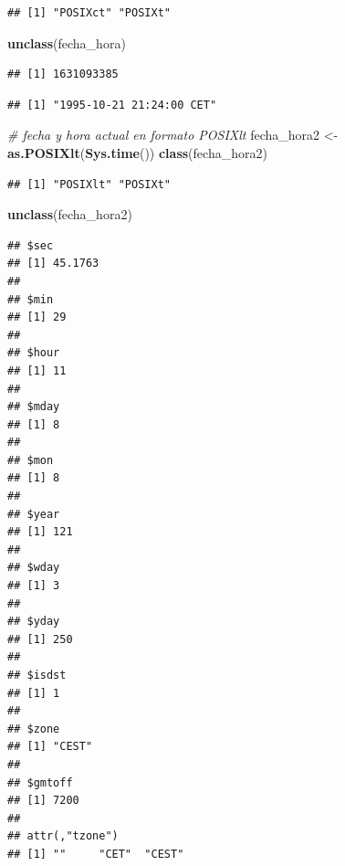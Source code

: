 \documentclass[11pt,]{book}
\newenvironment{Shaded}{\begin{snugshade}}{\end{snugshade}}
\newcommand{\CommentTok}[1]{\textcolor[rgb]{0.37,0.37,0.37}{\textit{#1}}}
\newcommand{\KeywordTok}[1]{\textcolor[rgb]{0.27,0.27,0.27}{\textbf{#1}}}
\newcommand{\NormalTok}[1]{#1}
\newcommand{\StringTok}[1]{\textcolor[rgb]{0.5,0.5,0.5}{#1}}
\begin{document}
\begin{verbatim}
## [1] "POSIXct" "POSIXt"
\end{verbatim}

\begin{Shaded}
\begin{Highlighting}[]
\KeywordTok{unclass}\NormalTok{(fecha_hora)}
\end{Highlighting}
\end{Shaded}

\begin{verbatim}
## [1] 1631093385
\end{verbatim}

\begin{Shaded}
\end{Shaded}

\begin{verbatim}
## [1] "1995-10-21 21:24:00 CET"
\end{verbatim}

\begin{Shaded}
\begin{Highlighting}[]
\CommentTok{# fecha y hora actual en formato POSIXlt}
\NormalTok{fecha_hora2 <-}\StringTok{ }\KeywordTok{as.POSIXlt}\NormalTok{(}\KeywordTok{Sys.time}\NormalTok{())}
\KeywordTok{class}\NormalTok{(fecha_hora2)}
\end{Highlighting}
\end{Shaded}

\begin{verbatim}
## [1] "POSIXlt" "POSIXt"
\end{verbatim}

\begin{Shaded}
\begin{Highlighting}[]
\KeywordTok{unclass}\NormalTok{(fecha_hora2)}
\end{Highlighting}
\end{Shaded}

\begin{verbatim}
## $sec
## [1] 45.1763
## 
## $min
## [1] 29
## 
## $hour
## [1] 11
## 
## $mday
## [1] 8
## 
## $mon
## [1] 8
## 
## $year
## [1] 121
## 
## $wday
## [1] 3
## 
## $yday
## [1] 250
## 
## $isdst
## [1] 1
## 
## $zone
## [1] "CEST"
## 
## $gmtoff
## [1] 7200
## 
## attr(,"tzone")
## [1] ""     "CET"  "CEST"
\end{verbatim}
\end{document}
